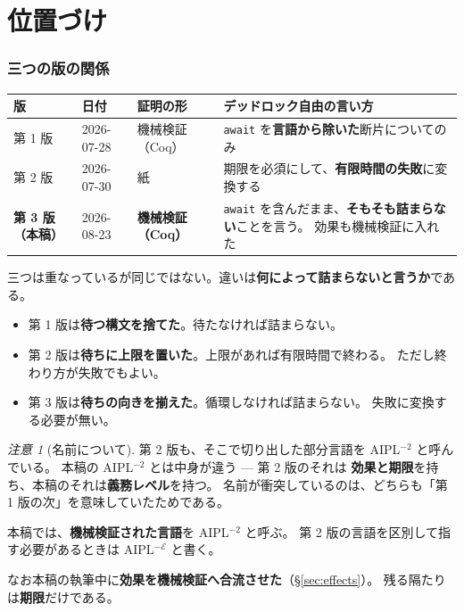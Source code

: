 \documentclass[11pt,a4paper]{ltjsarticle}
\theoremstyle{definition}
\theoremstyle{remark}
\newtheorem{remark}[theorem]{注意}
\begin{document}
\tableofcontents

\part{位置づけ}
\label{part:place}

\section{三つの版の関係}
\label{sec:versions}

\begin{center}
\small
\begin{tabular}{@{}lllp{5.2cm}@{}}
\toprule
版 & 日付 & 証明の形 & デッドロック自由の言い方 \\
\midrule
第 1 版 & 2026-07-28 & 機械検証（Coq） &
  \texttt{await} を\textbf{言語から除いた}断片についてのみ \\
第 2 版 & 2026-07-30 & 紙 &
  期限を必須にして、\textbf{有限時間の失敗}に変換する \\
\textbf{第 3 版（本稿）} & 2026-08-23 & \textbf{機械検証（Coq）} &
  \texttt{await} を含んだまま、\textbf{そもそも詰まらない}ことを言う。
  効果も機械検証に入れた \\
\bottomrule
\end{tabular}
\end{center}

三つは重なっているが同じではない。違いは\textbf{何によって詰まらないと言うか}である。

\begin{itemize}
\item 第 1 版は\textbf{待つ構文を捨てた}。待たなければ詰まらない。
\item 第 2 版は\textbf{待ちに上限を置いた}。上限があれば有限時間で終わる。
      ただし終わり方が失敗でもよい。
\item 第 3 版は\textbf{待ちの向きを揃えた}。循環しなければ詰まらない。
      失敗に変換する必要が無い。
\end{itemize}

\begin{remark}[名前について]
第 2 版も、そこで切り出した部分言語を AIPL$^{-2}$ と呼んでいる。
本稿の AIPL$^{-2}$ とは中身が違う --- 第 2 版のそれは
\textbf{効果と期限}を持ち、本稿のそれは\textbf{義務レベル}を持つ。
名前が衝突しているのは、どちらも「第 1 版の次」を意味していたためである。

本稿では、\textbf{機械検証された言語}を AIPL$^{-2}$ と呼ぶ。
第 2 版の言語を区別して指す必要があるときは AIPL$^{-\mathcal{E}}$ と書く。

なお本稿の執筆中に\textbf{効果を機械検証へ合流させた}（\S\ref{sec:effects}）。
残る隔たりは\textbf{期限}だけである。
\end{remark}
\end{document}
